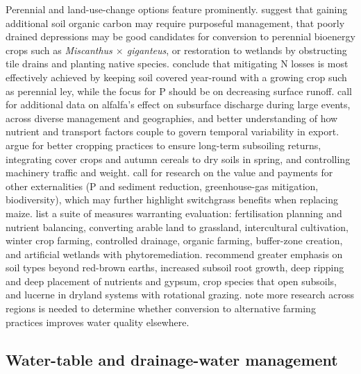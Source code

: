 \documentclass[11pt]{article}
\begin{document}
Perennial and land-use-change options feature prominently. \textcite{Huang2023} suggest that gaining additional soil organic carbon may require purposeful management, that poorly drained depressions may be good candidates for conversion to perennial bioenergy crops such as \textit{Miscanthus $\times$ giganteus}, or restoration to wetlands by obstructing tile drains and planting native species. \textcite{Norberg2022} conclude that mitigating N losses is most effectively achieved by keeping soil covered year-round with a growing crop such as perennial ley, while the focus for P should be on decreasing surface runoff. \textcite{Arrueta2025} call for additional data on alfalfa's effect on subsurface discharge during large events, across diverse management and geographies, and better understanding of how nutrient and transport factors couple to govern temporal variability in export. \textcite{Djiemon2019} argue for better cropping practices to ensure long-term subsoiling returns, integrating cover crops and autumn cereals to dry soils in spring, and controlling machinery traffic and weight. \textcite{Woodbury2018} call for research on the value and payments for other externalities (P and sediment reduction, greenhouse-gas mitigation, biodiversity), which may further highlight switchgrass benefits when replacing maize. \textcite{Siksnane2017} list a suite of measures warranting evaluation: fertilisation planning and nutrient balancing, converting arable land to grassland, intercultural cultivation, winter crop farming, controlled drainage, organic farming, buffer-zone creation, and artificial wetlands with phytoremediation. \textcite{GARDNER1992} recommend greater emphasis on soil types beyond red-brown earths, increased subsoil root growth, deep ripping and deep placement of nutrients and gypsum, crop species that open subsoils, and lucerne in dryland systems with rotational grazing. \textcite{Oquist2007} note more research across regions is needed to determine whether conversion to alternative farming practices improves water quality elsewhere.

\subsection{Water-table and drainage-water management}
\end{document}
